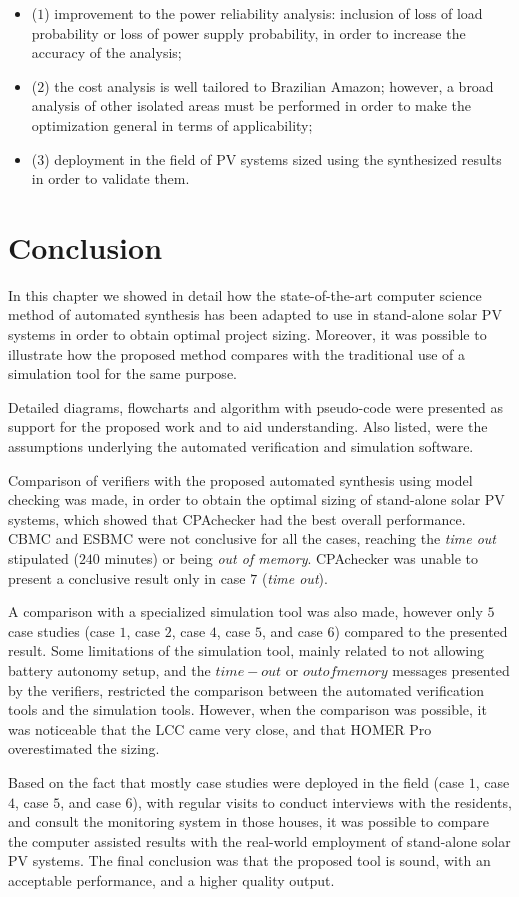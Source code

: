 \begin{itemize}
\item ($1$) improvement to the power reliability analysis: inclusion of loss of load probability or loss of power supply probability, in order to increase the accuracy of the analysis; 
\item ($2$) the cost analysis is well tailored to Brazilian Amazon; however, a broad analysis of other isolated areas must be  performed in order to make the optimization general in terms of applicability; 
\item ($3$) deployment in the field of PV systems sized using the synthesized results in order to validate them.
\end{itemize}


\section{Conclusion}

In this chapter we showed in detail how the state-of-the-art computer science method of automated synthesis has been adapted to use in stand-alone solar PV systems in order to obtain optimal project sizing. Moreover, it was possible to illustrate how the proposed method compares with the traditional use of a simulation tool for the same purpose.

Detailed diagrams, flowcharts and algorithm with pseudo-code were presented as support for the proposed work and to aid understanding. Also listed, were the assumptions underlying the automated verification and simulation software. 

Comparison of verifiers with the proposed automated synthesis using model checking was made, in order to obtain the optimal sizing of stand-alone solar PV systems, which showed that CPAchecker had the best overall performance. CBMC and ESBMC were not conclusive for all the cases, reaching the \textit{time out} stipulated ($240$ minutes) or being \textit{out of memory}. CPAchecker was unable to present a conclusive result only in case $7$ (\textit{time out}).

A comparison with a specialized simulation tool was also made, however only $5$ case studies (case $1$, case $2$, case $4$, case $5$, and case $6$) compared to the presented result. Some limitations of the simulation tool, mainly related to not allowing battery autonomy setup, and the $time-out$ or $out of memory$ messages presented by the verifiers, restricted the comparison between the automated verification tools and the simulation tools. However, when the comparison was possible, it was noticeable that the LCC came very close, and that HOMER Pro overestimated the sizing.

Based on the fact that mostly case studies were deployed in the field (case $1$, case $4$, case $5$, and case $6$), with regular visits to conduct interviews with the residents, and consult the monitoring system in those houses, it was possible to compare the computer assisted results with the real-world employment of stand-alone solar PV systems. The final conclusion was that the proposed tool is sound, with an acceptable performance, and a higher quality output.